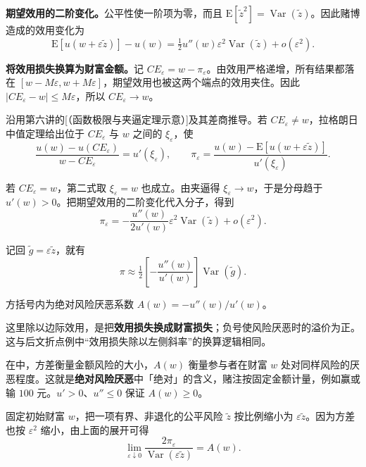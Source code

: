 \textbf{期望效用的二阶变化。}公平性使一阶项为零，而且 $\mathrm E[\tilde z^2]=\operatorname{Var}(\tilde z)$。因此赌博造成的效用变化为
\[
 \mathrm E[u(w+\varepsilon\tilde z)]-u(w)
 =\tfrac12u''(w)\varepsilon^2\operatorname{Var}(\tilde z)+o(\varepsilon^2).
\]

\textbf{将效用损失换算为财富金额。}记 $CE_\varepsilon=w-\pi_\varepsilon$。由效用严格递增，所有结果都落在 $[w-M\varepsilon,w+M\varepsilon]$，期望效用也被这两个端点的效用夹住。因此 $|CE_\varepsilon-w|\le M\varepsilon$，所以 $CE_\varepsilon\to w$。

沿用第六讲的[（函数极限与夹逼定理示意）]及其差商推导。若 $CE_\varepsilon\ne w$，拉格朗日中值定理给出位于 $CE_\varepsilon$ 与 $w$ 之间的 $\xi_\varepsilon$，使
\[
 \frac{u(w)-u(CE_\varepsilon)}{w-CE_\varepsilon}
 =u'(\xi_\varepsilon),\qquad
 \pi_\varepsilon
 =\frac{u(w)-\mathrm E[u(w+\varepsilon\tilde z)]}{u'(\xi_\varepsilon)}.
\]

若 $CE_\varepsilon=w$，第二式取 $\xi_\varepsilon=w$ 也成立。由夹逼得 $\xi_\varepsilon\to w$，于是分母趋于 $u'(w)>0$。把期望效用的二阶变化代入分子，得到
\[
 \pi_\varepsilon=-\frac{u''(w)}{2u'(w)}\varepsilon^2\operatorname{Var}(\tilde z)
 +o(\varepsilon^2).
\]

\hypertarget{wj-absolute-risk-aversion}{}
\begin{tcolorbox}[knowledge,title=Arrow--Pratt 绝对风险厌恶系数]
记回 $\tilde g=\varepsilon\tilde z$，就有
\begin{equation}
 \pi\approx\tfrac12\left[-\frac{u''(w)}{u'(w)}\right]\operatorname{Var}(\tilde g).
\label{eq:wj-seven-2}
\end{equation}

方括号内为绝对风险厌恶系数 $A(w)=-u''(w)/u'(w)$。
\end{tcolorbox}
这里除以边际效用，是把\textbf{效用损失换成财富损失}；负号使风险厌恶时的溢价为正。这与后文折点例中“效用损失除以左侧斜率”的换算逻辑相同。

在中，方差衡量金额风险的大小，$A(w)$ 衡量参与者在财富 $w$ 处对同样风险的厌恶程度。这就是\textbf{绝对风险厌恶}中「绝对」的含义，赌注按固定金额计量，例如赢或输 $100$ 元。$u'>0$、$u''\le 0$ 保证 $A(w)\ge 0$。

固定初始财富 $w$，把一项有界、非退化的公平风险 $\tilde z$ 按比例缩小为 $\varepsilon\tilde z$。因为方差也按 $\varepsilon^2$ 缩小，由上面的展开可得
\[
 \lim_{\varepsilon\downarrow0}
 \frac{2\pi_\varepsilon}{\operatorname{Var}(\varepsilon\tilde z)}=A(w).
\]

